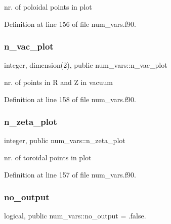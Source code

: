nr. of poloidal points in plot 



Definition at line 156 of file num\+\_\+vars.\+f90.

\mbox{\label{namespacenum__vars_a5331aef164e788f0e3aa354ea8059a01}} 
\subsubsection{\texorpdfstring{n\+\_\+vac\+\_\+plot}{n\_vac\_plot}}
{\footnotesize\ttfamily integer, dimension(2), public num\+\_\+vars\+::n\+\_\+vac\+\_\+plot}



nr. of points in R and Z in vacuum 



Definition at line 158 of file num\+\_\+vars.\+f90.

\mbox{\label{namespacenum__vars_a657b74ac497053e3c848796f1afaca5f}} 
\subsubsection{\texorpdfstring{n\+\_\+zeta\+\_\+plot}{n\_zeta\_plot}}
{\footnotesize\ttfamily integer, public num\+\_\+vars\+::n\+\_\+zeta\+\_\+plot}



nr. of toroidal points in plot 



Definition at line 157 of file num\+\_\+vars.\+f90.

\mbox{\label{namespacenum__vars_a324342d6240045750e38ef545801c49d}} 
\subsubsection{\texorpdfstring{no\+\_\+output}{no\_output}}
{\footnotesize\ttfamily logical, public num\+\_\+vars\+::no\+\_\+output = .false.}



